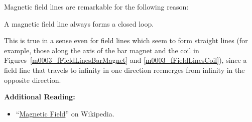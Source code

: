 Magnetic field lines are remarkable for the following reason:
%
\begin{mdframed}[backgroundcolor=yellow!20,nobreak=true] 
A magnetic field line always forms a closed loop. 
\end{mdframed}
%
This is true in a sense even for field lines which seem to form straight lines (for example, those along the axis of the bar magnet and the coil in Figures~\ref{m0003_fFieldLinesBarMagnet} and \ref{m0003_fFieldLinesCoil}), since a field line that travels to infinity in one direction reemerges from infinity in the opposite direction.


{\bf Additional Reading:}
\begin{itemize}
\item ``\href{https://en.wikipedia.org/wiki/Magnetic_field}{Magnetic Field}'' on Wikipedia.
\end{itemize}

